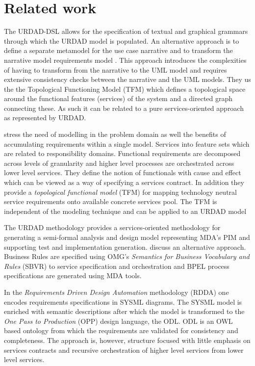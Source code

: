 \section{Related work \label{sec:relatedWork}}

The URDAD-DSL allows for the specification of textual and graphical grammars through which the URDAD model is populated. An alternative approach is to define a separate metamodel for the use case narrative and to transform the narrative model requirements model \cite{hoffmann_towards_2009,osis_transforming_2010}. This approach introduces the complexities of having to transform from the narrative to the UML model and requires extensive consistency checks between the narrative and the UML models. They us the the Topological Functioning Model (TFM) which defines a topological space around the functional features (services) of the system and a directed graph connecting these. As such it can be related to a pure services-oriented approach as represented by URDAD.

\cite{asnina_computation_2010} stress the need of modelling in the problem domain as well the benefits of accumulating requirements within a single model. Services into feature sets which are related to responsibility domains. Functional requirements are decomposed across levels of granularity and higher level processes are orchestrated across lower level services. They define the notion of functionals with cause and effect which can be viewed as a way of specifying a services contract. In addition they provide a {\em topological functional model} (TFM) for mapping technology neutral service requirements onto available concrete services pool. The TFM is independent of the modeling technique and can be applied to an URDAD model

The URDAD methodology provides a services-oriented methodology for generating a semi-formal analysis and design model representing MDA's PIM and supporting test and implementation generation. \cite{iacob_model-driven_2008} discuss an alternative approach. Business Rules are specified using OMG's {\em Semantics for Business Vocabulary and Rules} (SBVR) to service specification and orchestration and BPEL process specifications are generated using MDA tools.

In the {\em Requirements Driven Design Automation} methodology (RDDA) \cite{cardei_model_2008} one encodes requirements specifications in SYSML diagrams. The SYSML model is enriched with semantic descriptions after which the model is transformed to the {\em One Pass to Production} (OPP) design language, the ODL. ODL is an OWL based ontology from which the requirements are validated for consistency and completeness. The approach is, however, structure focused with little emphasis on services contracts and recursive orchestration of higher level services from lower level services.